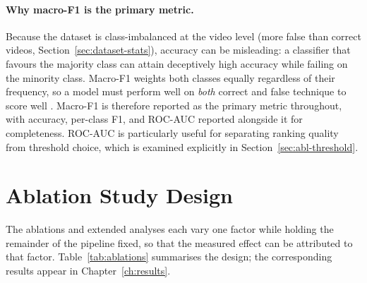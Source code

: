 \paragraph{Why macro-F1 is the primary metric.}
Because the dataset is class-imbalanced at the video level (more false than
correct videos, Section~\ref{sec:dataset-stats}), accuracy can be misleading: a
classifier that favours the majority class can attain deceptively high accuracy
while failing on the minority class. Macro-F1 weights both classes equally
regardless of their frequency, so a model must perform well on \emph{both}
correct and false technique to score well \cite{sokolova2009metrics}. Macro-F1 is
therefore reported as the primary metric throughout, with accuracy, per-class
F1, and ROC-AUC reported alongside it for completeness. ROC-AUC is particularly
useful for separating ranking quality from threshold choice, which is examined
explicitly in Section~\ref{sec:abl-threshold}.

\section{Ablation Study Design}
\label{sec:setup-ablations}

The ablations and extended analyses each vary one factor while holding the
remainder of the pipeline fixed, so that the measured effect can be attributed
to that factor. Table~\ref{tab:ablations} summarises the design; the
corresponding results appear in Chapter~\ref{ch:results}.

